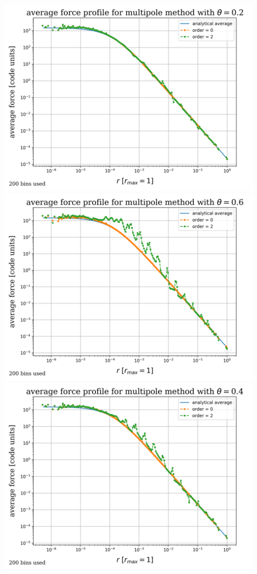 \begin{frame}
\begin{columns}
			\includegraphics[width=\textwidth]{../results/multipole_forces/bucket01/0.2/multipole_forces_plot-0.2.png}\\[2em]
			\includegraphics[width=\textwidth]{../results/multipole_forces/bucket01/0.6/multipole_forces_plot-0.6.png}
			\includegraphics[width=\textwidth]{../results/multipole_forces/bucket01/0.4/multipole_forces_plot-0.4.png}\\[2em]

\end{columns}
\end{frame}

